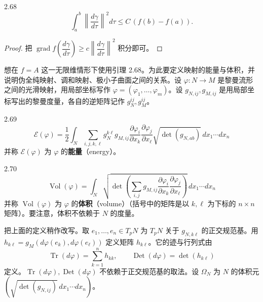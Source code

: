 \begin{lemma*}{2.68}
  \[
    \int_a^b\left\|\frac{d\gamma}{d\tau}\right\|^2 d\tau\le C\,(f(b)-f(a)).
  \]
\end{lemma*}

\begin{proof}
  把 $\operatorname{grad}f\left(\dfrac{d\gamma}{d\tau}\right)\ge c\left\|\dfrac{d\gamma}{d\tau}\right\|^2$ 积分即可。
\end{proof}


想在 $f=A$ 这一无限维情形下使用引理 2.68。为此要定义映射的能量与体积，并说明伪全纯映射、调和映射、极小子曲面之间的关系。设 $\varphi\colon N\to M$ 是黎曼流形之间的光滑映射，用局部坐标写作 $\varphi=(\varphi_1,\dots,\varphi_m)$。设 $g_{N,ij},g_{M,ij}$ 是用局部坐标写出的黎曼度量，各自的逆矩阵记作 $g_N^{ij},g_M^{ij}$。

\begin{definition}{2.69}
  \[
    \mathcal{E}(\varphi)=\frac12\int_N\sum_{i,j,k,\ell}g_N^{k\ell}g_{M,ij}
    \frac{\partial\varphi_i}{\partial x_k}\frac{\partial\varphi_j}{\partial x_\ell}
    \sqrt{\det(g_{N,ab})}\,dx_1\cdots dx_n
  \]
  并称 $\mathcal{E}(\varphi)$ 为 $\varphi$ 的\textbf{能量}（energy）。
\end{definition}

\begin{definition}{2.70}
  \[
    \operatorname{Vol}(\varphi)=\int_N\sqrt{\det\left(\sum_{i,j}g_{M,ij}
    \frac{\partial\varphi_i}{\partial x_k}\frac{\partial\varphi_j}{\partial x_\ell}\right)}
    \,dx_1\cdots dx_n
  \]
  并称 $\operatorname{Vol}(\varphi)$ 为 $\varphi$ 的\textbf{体积}（volume）（括号中的矩阵是以 $k,\ell$ 为下标的 $n\times n$ 矩阵）。要注意，体积不依赖于 $N$ 的度量。
\end{definition}


把上面的定义稍作改写。取 $e_1,\dots,e_n\in T_pN$ 为 $T_pN$ 关于 $g_{N,k\ell}$ 的正交规范基。用 $h_{k\ell}=g_M(d\varphi(e_k),d\varphi(e_\ell))$ 定义矩阵 $h_{k\ell}$。它的迹与行列式由
\[
  \operatorname{Tr}(d\varphi)=\sum_{k=1}^n h_{kk},\qquad
  \operatorname{Det}(d\varphi)=\det(h_{k\ell})
\]
定义。$\operatorname{Tr}(d\varphi),\operatorname{Det}(d\varphi)$ 不依赖于正交规范基的取法。设 $\Omega_N$ 为 $N$ 的体积元 $(\sqrt{\det(g_{N,ij})}\,dx_1\cdots dx_n)$。

